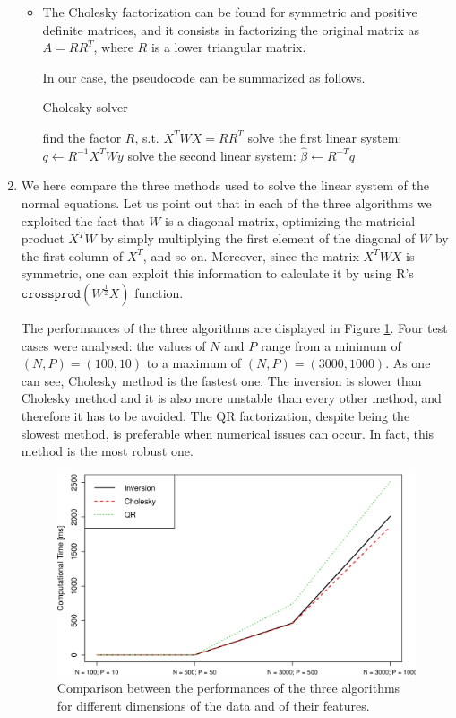 \documentclass{homework}
\begin{document}
\begin{enumerate}[label=(\Alph*)]
\begin{itemize}
\item The Cholesky factorization can be found for symmetric and positive definite matrices, and it consists in factorizing the original matrix as $A = RR^T$, where $R$ is a lower triangular matrix. 

In our case, the pseudocode can be summarized as follows.
\begin{algorithm}
\caption{Cholesky solver}\label{alg:chol}
\begin{algorithmic}[1]
\State find the factor $R$, s.t. $X^TWX = RR^T$
\State solve the first linear system: $q \gets R^{-1} X^TWy$
\State solve the second linear system: $\hat{\beta} \gets R^{-T} q$
\EndProcedure
\end{algorithmic}
\end{algorithm}
\end{itemize}

\item We here compare the three methods used to solve the linear system of the normal equations. Let us point out that in each of the three algorithms we exploited the fact that $W$ is a diagonal matrix, optimizing the matricial product $X^TW$ by simply multiplying the first element of the diagonal of $W$ by the first column of $X^T$, and so on. Moreover, since the matrix $X^T W X$ is symmetric, one can exploit this information to calculate it by using R's $\texttt{crossprod} (W^\frac{1}{2} X)$ function.

The performances of the three algorithms are displayed in Figure \ref{fig:perf1}. Four test cases were analysed: the values of $N$ and $P$ range from a minimum of $(N,P) = (100,10)$ to a maximum of $(N,P) = (3000,1000)$. As one can see, Cholesky method is the fastest one. The inversion is slower than Cholesky method and it is also more unstable than every other method, and therefore it has to be avoided. The QR factorization, despite being the slowest method, is preferable when numerical issues can occur. In fact, this method is the most robust one.

\begin{figure}[!ht]
\centering
\includegraphics[width=0.6\columnwidth]{./Img/perf}
\caption{Comparison between the performances of the three algorithms for different dimensions of the data and of their features.}
\label{fig:perf1}
\end{figure}


\end{enumerate}
\end{document}
